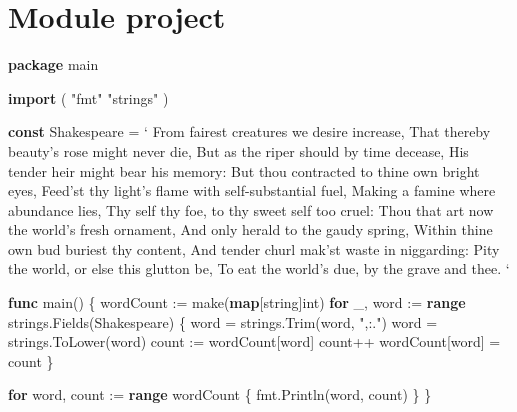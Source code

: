 \documentclass[]{book}
\newenvironment{Shaded}{\begin{snugshade}}{\end{snugshade}}
\newcommand{\BuiltInTok}[1]{#1}
\newcommand{\DataTypeTok}[1]{\textcolor[rgb]{0.13,0.29,0.53}{#1}}
\newcommand{\KeywordTok}[1]{\textcolor[rgb]{0.13,0.29,0.53}{\textbf{#1}}}
\newcommand{\NormalTok}[1]{#1}
\newcommand{\StringTok}[1]{\textcolor[rgb]{0.31,0.60,0.02}{#1}}
\begin{document}
\hypertarget{module-project-2}{%
\section*{Module project}\label{module-project-2}}

\begin{Shaded}
\begin{Highlighting}[]
\KeywordTok{package}\NormalTok{ main}

\KeywordTok{import}\NormalTok{ (}
    \StringTok{"fmt"}
    \StringTok{"strings"}
\NormalTok{)}

\KeywordTok{const}\NormalTok{ Shakespeare = }\StringTok{`}
\StringTok{From fairest creatures we desire increase,}
\StringTok{That thereby beauty's rose might never die,}
\StringTok{But as the riper should by time decease,}
\StringTok{His tender heir might bear his memory:}
\StringTok{But thou contracted to thine own bright eyes,}
\StringTok{Feed'st thy light's flame with self-substantial fuel,}
\StringTok{Making a famine where abundance lies,}
\StringTok{Thy self thy foe, to thy sweet self too cruel:}
\StringTok{Thou that art now the world's fresh ornament,}
\StringTok{And only herald to the gaudy spring,}
\StringTok{Within thine own bud buriest thy content,}
\StringTok{And tender churl mak'st waste in niggarding:}
\StringTok{  Pity the world, or else this glutton be,}
\StringTok{  To eat the world's due, by the grave and thee.}
\StringTok{`}

\KeywordTok{func}\NormalTok{ main() \{}
\NormalTok{    wordCount := }\BuiltInTok{make}\NormalTok{(}\KeywordTok{map}\NormalTok{[}\DataTypeTok{string}\NormalTok{]}\DataTypeTok{int}\NormalTok{)}
    \KeywordTok{for}\NormalTok{ _, word := }\KeywordTok{range}\NormalTok{ strings.Fields(Shakespeare) \{}
\NormalTok{        word = strings.Trim(word, }\StringTok{",:."}\NormalTok{)}
\NormalTok{        word = strings.ToLower(word)}
\NormalTok{        count := wordCount[word]}
\NormalTok{        count++}
\NormalTok{        wordCount[word] = count}
\NormalTok{    \}}

    \KeywordTok{for}\NormalTok{ word, count := }\KeywordTok{range}\NormalTok{ wordCount \{}
\NormalTok{        fmt.Println(word, count)}
\NormalTok{    \}}
\NormalTok{\}}
\end{Highlighting}
\end{Shaded}
\end{document}
